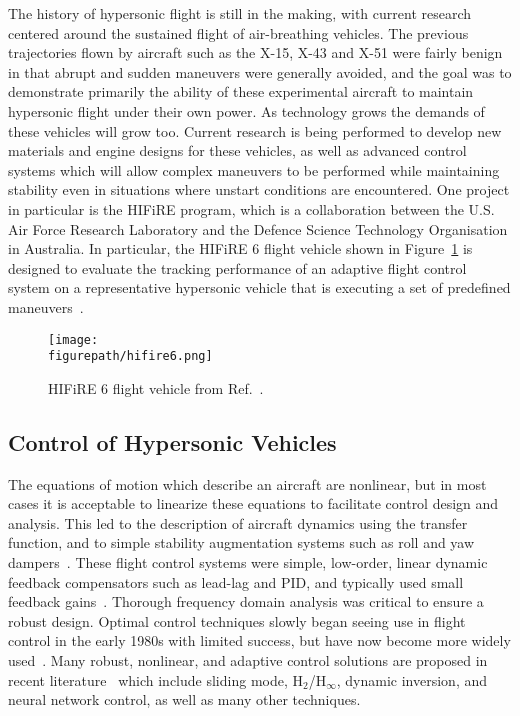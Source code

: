 The history of hypersonic flight is still in the making, with current research centered around the sustained flight of air-breathing vehicles.
The previous trajectories flown by aircraft such as the X-15, X-43 and X-51 were fairly benign in that abrupt and sudden maneuvers were generally avoided, and the goal was to demonstrate primarily the ability of these experimental aircraft to maintain hypersonic flight under their own power.
As technology grows the demands of these vehicles will grow too.
Current research is being performed to develop new materials and engine designs for these vehicles, as well as advanced control systems which will allow complex maneuvers to be performed while maintaining stability even in situations where unstart conditions are encountered.
One project in particular is the HIFiRE program, which is a collaboration between the U.S. Air Force Research Laboratory and the Defence Science Technology Organisation in Australia.
In particular, the HIFiRE 6 flight vehicle shown in Figure~\ref{fig.hifire6vehicle} is designed to evaluate the tracking performance of an adaptive flight control system on a representative hypersonic vehicle that is executing a set of predefined maneuvers\ \cite{adamczak.hifire6.2015, bolender.hifire6.2012, dauby.hifire6overview.2015}.

\begin{figure}[H]
  \begin{center}
    \texttt{[image: \\figurepath/hifire6.png]}
    \caption{HIFiRE 6 flight vehicle from Ref.\ \cite{dauby.hifire6overview.2015}.\label{fig.hifire6vehicle}}
  \end{center}
\end{figure}

\subsection{Control of Hypersonic Vehicles}

The equations of motion which describe an aircraft are nonlinear, but in most cases it is acceptable to linearize these equations to facilitate control design and analysis.
This led to the description of aircraft dynamics using the transfer function, and to simple stability augmentation systems such as roll and yaw dampers\ \cite{cook.flightdynamics.2007}.
These flight control systems were simple, low-order, linear dynamic feedback compensators such as lead-lag and PID, and typically used small feedback gains\ \cite{dazzo.linearcontrol.2003, mclean.flightcontrol.1990, yechout.flightmechanics.2003}.
Thorough frequency domain analysis was critical to ensure a robust design.
Optimal control techniques slowly began seeing use in flight control in the early 1980s with limited success, but have now become more widely used\ \cite{abzug.stability.2005, chandler.lqrshortcomings.1983, stengel.flightdynamics.2004, stevenslewis.aircraftcontrol.2003}.
Many robust, nonlinear, and adaptive control solutions are proposed in recent literature\ \cite{bolender.hifire6.2012, gibson.adaptive.2008, huang.robust.2012, hughes.hinfinity.2010,   rollins.nonlinear.2013, xu.adaptive.2004} which include sliding mode, H$_{2}$/H$_{\infty}$, dynamic inversion, and neural network control, as well as many other techniques.

